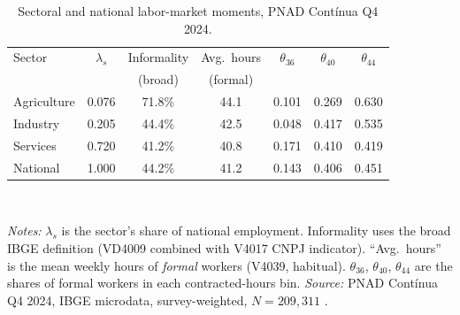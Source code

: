 \begin{table}[htbp]
\centering
\caption{Sectoral and national labor-market moments, PNAD Cont\'{i}nua Q4 2024.}\label{tab:facts_informality}
\small
\begin{tabular}{lcccccc}
\hline\hline
Sector & $\lambda_s$ & Informality & Avg.\ hours & $\theta_{36}$ & $\theta_{40}$ & $\theta_{44}$ \\
 & & (broad) & (formal) & & & \\
\hline
Agriculture & 0.076 & 71.8\% & 44.1 & 0.101 & 0.269 & 0.630 \\
Industry    & 0.205 & 44.4\% & 42.5 & 0.048 & 0.417 & 0.535 \\
Services    & 0.720 & 41.2\% & 40.8 & 0.171 & 0.410 & 0.419 \\
\hline
National    & 1.000 & 44.2\% & 41.2 & 0.143 & 0.406 & 0.451 \\
\hline\hline
\end{tabular}
\\[2pt]
\begin{minipage}{0.95\textwidth}
\justifying
{\footnotesize \textit{Notes:} $\lambda_s$ is the sector's share of national employment. Informality uses the broad IBGE definition (VD4009 combined with V4017 CNPJ indicator). ``Avg.\ hours'' is the mean weekly hours of \emph{formal} workers (V4039, habitual). $\theta_{36}$, $\theta_{40}$, $\theta_{44}$ are the shares of formal workers in each contracted-hours bin. \textit{Source:} PNAD Cont\'{i}nua Q4 2024, IBGE microdata, survey-weighted, $N=209{,}311$ \citep{PNAD2025}.}
\end{minipage}
\end{table}
